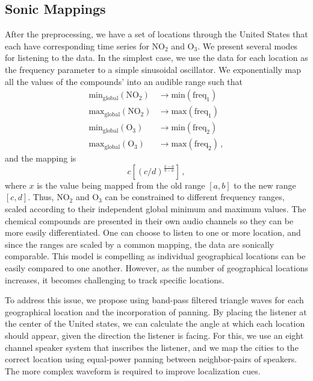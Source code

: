 \documentclass[a4paper,10pt,oneside]{article}
\newcommand{\ce}[1]{$\mathrm{#1}$}
\begin{document}
\begin{sloppy}
\subsection{Sonic Mappings}
\label{sec:sonic-mappings}
After the preprocessing, we have a set of locations through the United States that each have corresponding time series for \ce{NO_2} and \ce{O_3}. We present several modes for listening to the data. In the simplest case, we use the data for each location as the frequency parameter to a simple sinusoidal oscillator.  We exponentially map all the values of the compounds' into an audible range such that 
\begin{align}
    \text{min}_{\text{global}}(\text{\ce{NO_2}}) &\rightarrow
    \text{min}(\text{freq}_1) \\
    \text{max}_{\text{global}}(\text{\ce{NO_2}}) &\rightarrow
    \text{max}(\text{freq}_1) \\
    \text{min}_{\text{global}}(\text{\ce{O_3}}) &\rightarrow
    \text{min}(\text{freq}_2) \\
    \text{max}_{\text{global}}(\text{\ce{O_3}}) &\rightarrow
    \text{max}(\text{freq}_2)
    \,,
\end{align}
and the mapping is
\begin{equation}
    c \left[(c/d)^{\frac{x-a}{b-a}}\right]\,,
\end{equation}
where $x$ is the value being mapped from the old range $[a, b]$ to the new range $[c, d]$.  Thus, \ce{NO_2} and \ce{O_3} can be constrained to different frequency ranges, scaled according to their independent global minimum and maximum values.  The chemical compounds are presented in their own audio channels so they can be more easily differentiated.  One can choose to listen to one or more location, and since the ranges are scaled by a common mapping, the data are sonically comparable. This model is compelling as individual geographical locations can be easily compared to one another. However, as the number of geographical locations increases, it becomes challenging to track specific locations. 

To address this issue, we propose using band-pass filtered triangle waves for each geographical location and the incorporation of panning. By placing the listener at the center of the United states, we can calculate the angle at which each location should appear, given the direction the listener is facing.  For this, we use an eight channel speaker system that inscribes the listener, and we map the cities to the correct location using equal-power panning between neighbor-pairs of speakers.  The more complex waveform is required to improve localization cues.  


\end{sloppy}
\end{document}
